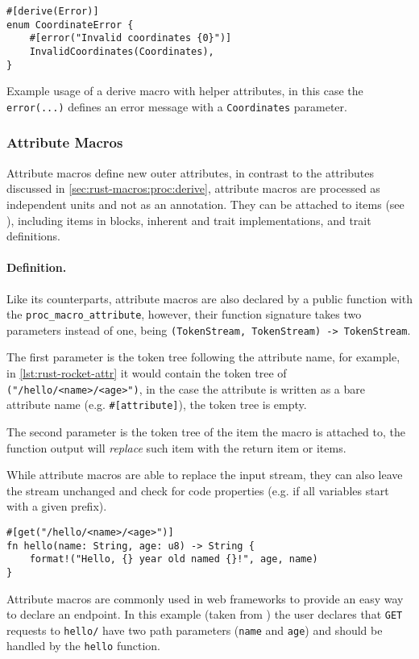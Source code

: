 \begin{listing}
    \centering
    \begin{verbatim}
#[derive(Error)]
enum CoordinateError {
    #[error("Invalid coordinates {0}")]
    InvalidCoordinates(Coordinates),
}
    \end{verbatim}
    \caption{
        Example usage of a derive macro with helper attributes,
        in this case the \texttt{error(...)} defines an error message with a \texttt{Coordinates} parameter.
    }
    \label{lst:rust-derive-error}
\end{listing}

\subsubsection*{Attribute Macros}\label{sec:rust-macros:proc:attr}
Attribute macros define new outer attributes,
in contrast to the attributes discussed in \autoref{sec:rust-macros:proc:derive},
attribute macros are processed as independent units and not as an annotation.
They can be attached to items (see \autocite[Section 6]{RustRef2021}),
including items in  blocks, inherent and trait implementations, and trait definitions.

\paragraph{Definition.}
Like its counterparts, attribute macros are also declared by a public function with the \texttt{proc\_macro\_attribute},
however, their function signature takes two parameters instead of one, being \texttt{(TokenStream, TokenStream) -> TokenStream}.

The first parameter is the token tree following the attribute name, for example, in \autoref{lst:rust-rocket-attr}
it would contain the token tree of \texttt{("/hello/<name>/<age>")},
in the case the attribute is written as a bare attribute name (e.g. \texttt{\#[attribute]}),
the token tree is empty.

The second parameter is the token tree of the item the macro is attached to,
the function output will \emph{replace} such item with the return item or items.

While attribute macros are able to replace the input stream,
they can also leave the stream unchanged and check for code properties (e.g. if all variables start with a given prefix).

\begin{listing}
    \centering
    \begin{verbatim}
#[get("/hello/<name>/<age>")]
fn hello(name: String, age: u8) -> String {
    format!("Hello, {} year old named {}!", age, name)
}
    \end{verbatim}
    \caption{
        Attribute macros are commonly used in web frameworks to provide an easy way to declare an endpoint.
        In this example (taken from \autocite{Rocket2021}) the user declares that \texttt{GET} requests to \texttt{hello/}
        have two path parameters (\texttt{name} and \texttt{age}) and should be handled by the \texttt{hello} function.
    }
    \label{lst:rust-rocket-attr}
\end{listing}

